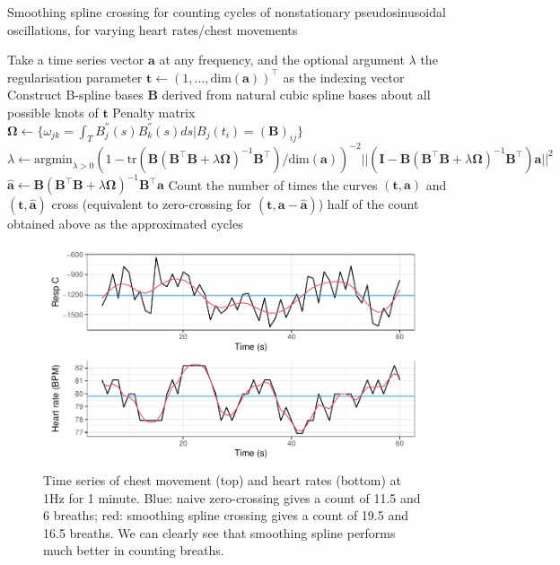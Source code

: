 \documentclass[
]{article}
\begin{document}
\begin{algorithm}
\caption{Smoothing spline crossing for counting cycles of nonstationary pseudosinusoidal oscillations, for varying heart rates/chest movements}
\begin{algorithmic}[1]
\STATE Take a time series vector $\mathbf{a}$ at any frequency, and the optional argument $\lambda$ the regularisation parameter
\STATE $\mathbf{t} \leftarrow (1, ..., \text{dim}(\mathbf{a}))^\top$ as the indexing vector
\STATE Construct B-spline bases $\mathbf{B}$ derived from natural cubic spline bases about all possible knots of $\mathbf{t}$
\STATE Penalty matrix $\boldsymbol{\Omega} \leftarrow \{\omega_{jk} = \int_T {B_j^{''}(s)B_k^{''}(s)}ds | B_j(t_i) = (\mathbf{B})_{ij}\}$
\STATE $\lambda \leftarrow \text{argmin}_{\lambda > 0} (1 - \text{tr}(\mathbf{B}(\mathbf{B}^\top\mathbf{B} + \lambda\boldsymbol{\Omega})^{-1}\mathbf{B}^\top) / \text{dim}(\mathbf{a}))^{-2}||(\mathbf{I} - \mathbf{B}(\mathbf{B}^\top\mathbf{B} + \lambda\boldsymbol{\Omega})^{-1}\mathbf{B}^\top)\mathbf{a}||^2$
\ENDIF
\STATE $\mathbf{\hat{a}} \leftarrow \mathbf{B}(\mathbf{B}^\top\mathbf{B} + \lambda\boldsymbol{\Omega})^{-1}\mathbf{B}^\top\mathbf{a}$
\STATE Count the number of times the curves $(\mathbf{t}, \mathbf{a})$ and $(\mathbf{t}, \mathbf{\hat{a}})$ cross (equivalent to zero-crossing for $(\mathbf{t}, \mathbf{a} - \mathbf{\hat{a}})$)
\RETURN half of the count obtained above as the approximated cycles
\end{algorithmic}
\end{algorithm}

\begin{figure}

{\centering \includegraphics{report_files/figure-latex/sszc-1} 

}

\caption{Time series of chest movement (top) and heart rates (bottom) at 1Hz for 1 minute. Blue: naive zero-crossing gives a count of 11.5 and 6 breaths; red: smoothing spline crossing gives a count of 19.5 and 16.5 breaths. We can clearly see that smoothing spline performs much better in counting breaths.}\label{fig:sszc}
\end{figure}
\end{document}
